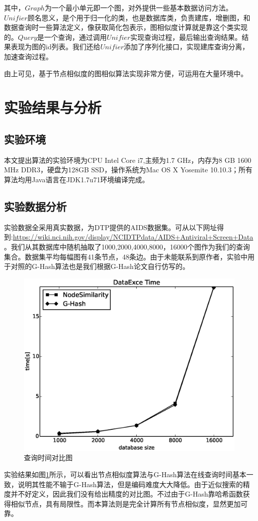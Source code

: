 \documentclass{XDBAthesis}
\begin{document}
其中，$Graph$为一个最小单元即一个图，对外提供一些基本数据访问方法。$Unifier$顾名思义，是个用于归一化的类，也是数据库类，负责建库，增删图，和数据查询时一些算法定义，像获取简化包表示，图相似度计算就是靠这个类实现的。$Query$是一个查询，通过调用$Unifier$实现查询过程，最后输出查询结果。结果表现为图的id列表。我们还给$Unifier$添加了序列化接口，实现建库查询分离，加速查询过程。

由上可见，基于节点相似度的图相似算法实现非常方便，可运用在大量环境中。


\section{实验结果与分析}
\subsection{实验环境}
本文提出算法的实验环境为CPU Intel Core i7,主频为1.7 GHz，内存为8 GB 1600 MHz DDR3，硬盘为128GB SSD，操作系统为Mac OS X Yosemite 10.10.3；所有算法均用Java语言在JDK1.7u71环境编译完成。
\subsection{实验数据分析}
实验数据全采用真实数据，为DTP提供的AIDS数据集。可从以下网址得到:\url{https://wiki.nci.nih.gov/display/NCIDTPdata/AIDS+Antiviral+Screen+Data}。我们从其数据库中随机抽取了1000,2000,4000,8000，16000个图作为我们的查询集合。数据集平均每幅图有41条节点，48条边。由于未能联系到原作者，实验中用于对照的G-Hash算法也是我们根据G-Hash论文\cite{ghash}自行仿写的。
\begin{figure}[htb]
    \centering
    \includegraphics[width=\textwidth]{../figures/THC/G-Hashcomapre}
    \caption{查询时间对比图}
    \label{fg:ghashtime}
\end{figure}

实验结果如图\ref{fg:ghashtime}所示，可以看出节点相似度算法与G-Hash算法在线查询时间基本一致，说明其性能不输于G-Hash算法，但是编码难度大大降低。由于近似搜索的精度并不好定义，因此我们没有给出精度的对比图。不过由于G-Hash靠哈希函数获得相似节点，具有局限性。而本算法则是完全计算所有节点相似度，显然更加可靠。

\ifx\allfiles\undefined
%

\end{document}
